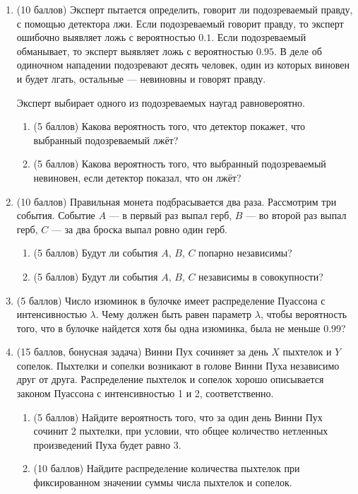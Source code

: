 \begin{enumerate}
 \item 
 (10 баллов) Эксперт пытается определить, говорит ли подозреваемый правду, с помощью детектора лжи.
 Если подозреваемый говорит правду, то эксперт ошибочно выявляет ложь с вероятностью $0.1$. 
 Если подозреваемый обманывает, то эксперт выявляет ложь с вероятностью $0.95$.
 В деле об одиночном нападении подозревают десять человек, один из которых виновен и будет лгать, 
 остальные — невиновны и говорят правду.

 Эксперт выбирает одного из подозреваемых наугад равновероятно.
 \begin{enumerate}
 \item (5 баллов) Какова вероятность того, что детектор покажет, что выбранный подозреваемый лжёт?
 \item (5 баллов) Какова вероятность того, что выбранный подозреваемый невиновен, если детектор показал, что он лжёт?
 \end{enumerate}
 
 
 \item (10 баллов) Правильная монета подбрасывается два раза. 
 Рассмотрим три события.
 Событие $A$ — в первый раз выпал герб, $B$ — во второй раз выпал герб, $C$ — за два броска выпал ровно один герб.
 
 \begin{enumerate}
 \item (5 баллов) Будут ли события $A$, $B$, $C$ попарно независимы?
 \item (5 баллов) Будут ли события $A$, $B$, $C$ независимы в совокупности?
 \end{enumerate}
 
 \item (5 баллов) Число изюминок в булочке имеет распределение Пуассона с интенсивностью $\lambda$. 
 Чему должен быть равен параметр $\lambda$, чтобы вероятность того, 
 что в булочке найдется хотя бы одна изюминка, была не меньше 0.99?
 
 
 \item (15 баллов, бонусная задача)
 Винни Пух сочиняет за день $X$ пыхтелок и $Y$ сопелок. 
 Пыхтелки и сопелки возникают в голове Винни Пуха независимо друг от друга. 
 Распределение пыхтелок и сопелок хорошо описывается законом Пуассона с интенсивностью 1 и 2, соответственно. 
 \begin{enumerate}
 \item (5 баллов) Найдите вероятность того, что за один день Винни Пух сочинит 2 пыхтелки, при условии, что общее количество нетленных произведений Пуха будет равно 3. 
 \item (10 баллов) Найдите распределение количества пыхтелок при фиксированном значении суммы числа пыхтелок и сопелок.
 \end{enumerate}
 
 
\end{enumerate}

